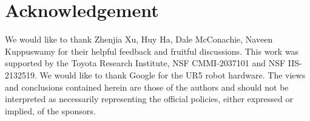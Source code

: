 \documentclass[conference]{IEEEtran}
\begin{document}
\IEEEpeerreviewmaketitle








\section*{Acknowledgement} We would like to thank Zhenjia Xu, Huy Ha, Dale McConachie, Naveen Kuppuswamy for their helpful feedback and fruitful discussions. This work was supported by the Toyota Research Institute, NSF CMMI-2037101 and NSF IIS-2132519. We would like to thank Google for the UR5 robot hardware. The views and conclusions contained herein are those of the authors and should not be interpreted as necessarily representing the official policies, either expressed or implied, of the sponsors.



\end{document}
